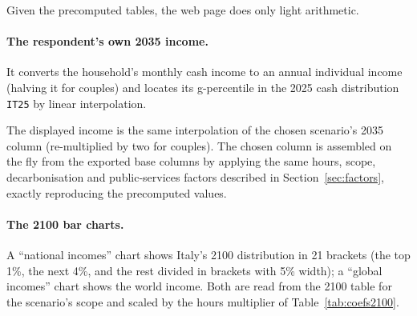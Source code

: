 \documentclass[12pt,a4paper]{article}
\newcommand{\note}[1]{%
  \begin{center}
    \colorbox{yellow!30}{\parbox{0.9\linewidth}{\textbf{Note:} #1}}
  \end{center}}
\newcommand{\col}[1]{\texttt{#1}}
\begin{document}
Given the precomputed tables, the web page does only light arithmetic.

\paragraph{The respondent's own 2035 income.} It converts the household's monthly cash income to an annual individual income %
(halving it for couples) and locates its g-percentile %
in the 2025 cash distribution \col{IT25} by linear interpolation.

The displayed income is the same interpolation of the chosen scenario's 2035 column (re-multiplied by two for couples). %
The chosen column is assembled on the fly from the exported base columns by applying the same hours, scope, decarbonisation and public-services factors described in Section~\ref{sec:factors}, exactly reproducing the precomputed values.

\paragraph{The 2100 bar charts.} A ``national incomes'' chart shows Italy's 2100 distribution in 21 brackets (the top 1\%, the next 4\%, and the rest divided in brackets with 5\% width); a ``global incomes'' chart shows the world income. Both are read from the 2100 table for the scenario's scope and scaled by the hours multiplier of Table~\ref{tab:coefs2100}. %


\end{document}
